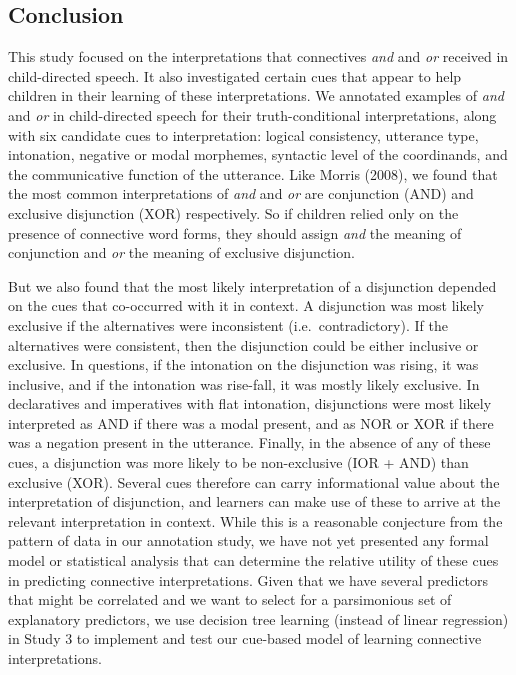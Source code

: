 \documentclass[
  ,man,floatsintext]{apa6}
\begin{document}
\hypertarget{conclusion}{%
\subsection{Conclusion}\label{conclusion}}

This study focused on the interpretations that connectives \emph{and} and \emph{or} received in child-directed speech. It also investigated certain cues that appear to help children in their learning of these interpretations. We annotated examples of \emph{and} and \emph{or} in child-directed speech for their truth-conditional interpretations, along with six candidate cues to interpretation: logical consistency, utterance type, intonation, negative or modal morphemes, syntactic level of the coordinands, and the communicative function of the utterance. Like Morris (2008), we found that the most common interpretations of \emph{and} and \emph{or} are conjunction (AND) and exclusive disjunction (XOR) respectively. So if children relied only on the presence of connective word forms, they should assign \emph{and} the meaning of conjunction and \emph{or} the meaning of exclusive disjunction.

But we also found that the most likely interpretation of a disjunction depended on the cues that co-occurred with it in context. A disjunction was most likely exclusive if the alternatives were inconsistent (i.e.~contradictory). If the alternatives were consistent, then the disjunction could be either inclusive or exclusive. In questions, if the intonation on the disjunction was rising, it was inclusive, and if the intonation was rise-fall, it was mostly likely exclusive. In declaratives and imperatives with flat intonation, disjunctions were most likely interpreted as AND if there was a modal present, and as NOR or XOR if there was a negation present in the utterance. Finally, in the absence of any of these cues, a disjunction was more likely to be non-exclusive (IOR + AND) than exclusive (XOR). Several cues therefore can carry informational value about the interpretation of disjunction, and learners can make use of these to arrive at the relevant interpretation in context. While this is a reasonable conjecture from the pattern of data in our annotation study, we have not yet presented any formal model or statistical analysis that can determine the relative utility of these cues in predicting connective interpretations. Given that we have several predictors that might be correlated and we want to select for a parsimonious set of explanatory predictors, we use decision tree learning (instead of linear regression) in Study 3 to implement and test our cue-based model of learning connective interpretations.
\end{document}
